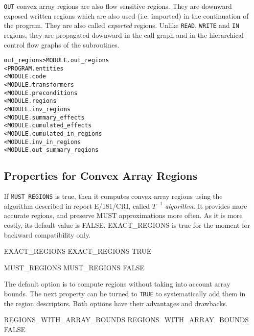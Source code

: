 \documentclass[a4paper]{report}
\newenvironment{PipsMake}{\begin{alltt}}{\end{alltt}}
\begin{document}
\verb+OUT+ convex array regions are also flow sensitive regions. They are downward
exposed written regions which are also used (i.e. imported) in the
continuation of the program. They are also called {\em exported\/} regions.
Unlike \verb+READ+, \verb+WRITE+ and \verb+IN+ regions, they are propagated
downward in the call graph and in the hierarchical control flow graphs of
the subroutines.

\begin{PipsMake}
out_regions                     > MODULE.out_regions
        < PROGRAM.entities
        < MODULE.code
        < MODULE.transformers
        < MODULE.preconditions
        < MODULE.regions
        < MODULE.inv_regions
        < MODULE.summary_effects
        < MODULE.cumulated_effects
        < MODULE.cumulated_in_regions
        < MODULE.inv_in_regions
        < MODULE.out_summary_regions
\end{PipsMake}

\subsection{Properties for Convex Array Regions}
\label{subsection-regions}

If {\tt MUST\_REGIONS} is true, then it computes convex array regions using the
algorithm described in report E/181/CRI, called {\em $T^{-1}$
algorithm}. It provides more accurate regions, and preserve MUST
approximations more often. As it is more costly, its default value
is FALSE. EXACT\_REGIONS is true for the moment for backward
compatibility only.

\begin{PipsProp}{EXACT_REGIONS}
EXACT_REGIONS TRUE
\end{PipsProp}

\begin{PipsProp}{MUST_REGIONS}
MUST_REGIONS FALSE
\end{PipsProp}

The default option is to compute regions without taking into account array
bounds. The next property can be turned to {\tt TRUE} to
systematically add them in
the region descriptors. Both options have their advantages and drawbacks.

\begin{PipsProp}{REGIONS_WITH_ARRAY_BOUNDS}
REGIONS_WITH_ARRAY_BOUNDS FALSE
\end{PipsProp}
\end{document}
